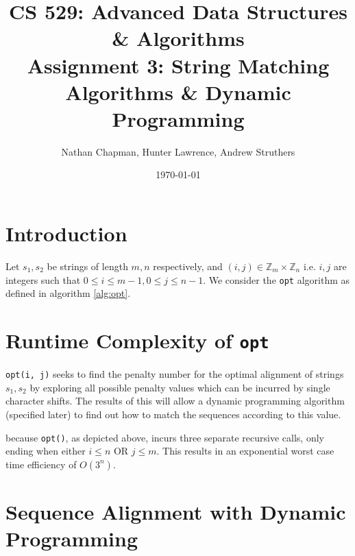\documentclass{article}
\title{\vspace*{-0.625in}CS 529: Advanced Data Structures \& Algorithms \\ Assignment 3: String Matching Algorithms \& Dynamic Programming}
\author{Nathan Chapman, Hunter Lawrence, Andrew Struthers}
\date{\today}
\renewcommand{\_}{\ifincsname_\else\legacyunderscore\fi}
\newcommand{\integer}{\textbf{int} }
\begin{document}
    \maketitle

    \section*{Introduction}

        Let $s_1, s_2$ be strings of length $m, n$ respectively, and $(i, j) \in \mathbb{Z}_m \times \mathbb{Z}_n$ i.e. $i, j$ are integers such that $0 \leq i \leq m - 1, 0 \leq j \leq n - 1$.  We consider the \texttt{opt} algorithm as defined in algorithm \ref{alg:opt}.

        \begin{function}
            \caption{opt(\integer $i$, \integer $j$)}
            \label{alg:opt}
            
        \end{function}

    \section*{Runtime Complexity of \texttt{opt}}

    \texttt{opt(i, j)} seeks to find the penalty number for the optimal alignment of strings $s_1, s_2$ by exploring all possible penalty values which can be incurred by single character shifts. The results of this will allow a dynamic programming algorithm (specified later) to find out how to match the sequences according to this value.

    because \texttt{opt()}, as depicted above, incurs three separate recursive calls, only ending when either $i \leq  n $ OR $ j \leq m$. This results in an exponential worst case time efficiency of $O(3^n)$. 
\pagebreak
    \section*{Sequence Alignment with Dynamic Programming}
\end{document}
